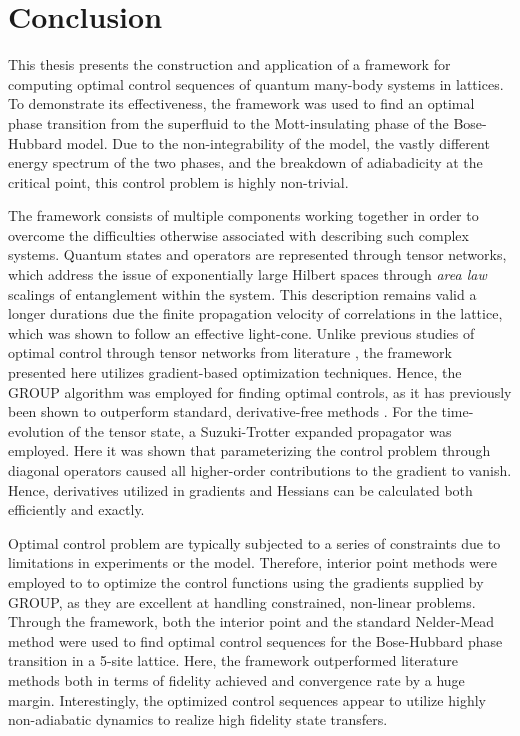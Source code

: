 \chapter{Conclusion}

This thesis presents the construction and application of a framework for computing optimal control sequences of quantum many-body systems in lattices. To demonstrate its effectiveness, the framework was used to find an optimal phase transition from the superfluid to the Mott-insulating phase of the Bose-Hubbard model. Due to the non-integrability of the model, the vastly different energy spectrum of the two phases, and the breakdown of adiabadicity at the critical point, this control problem is highly non-trivial.

The framework consists of multiple components working together in order to overcome the difficulties otherwise associated with describing such complex systems. 
Quantum states and operators are represented through tensor networks, which address the issue of exponentially large Hilbert spaces through \textit{area law} scalings of entanglement within the system. 
This description remains valid a longer durations due the finite propagation velocity of correlations in the lattice, which was shown to follow an effective light-cone.
Unlike previous studies of optimal control through tensor networks from literature \cite{Doria2011,FrankBloch}, the framework presented here utilizes gradient-based optimization techniques.
Hence, the GROUP algorithm was employed for finding optimal controls, as it has previously been shown to outperform standard, derivative-free methods \cite{sorensen2018}.
For the time-evolution of the tensor state, a Suzuki-Trotter expanded propagator was employed. Here it was shown that parameterizing the control problem through diagonal operators caused all higher-order contributions to the gradient to vanish. Hence, derivatives utilized in gradients and Hessians can be calculated both efficiently and exactly.

Optimal control problem are typically subjected to a series of constraints due to limitations in experiments or the model. Therefore, interior point methods were employed to to optimize the control functions using the gradients supplied by GROUP, as they are excellent at handling constrained, non-linear problems. 
Through the framework, both the interior point and the standard Nelder-Mead method were used to find optimal control sequences for the Bose-Hubbard phase transition in a 5-site lattice. Here, the framework outperformed literature methods both in terms of fidelity achieved and convergence rate by a huge margin. Interestingly, the optimized control sequences appear to utilize highly non-adiabatic dynamics to realize high fidelity state transfers.

